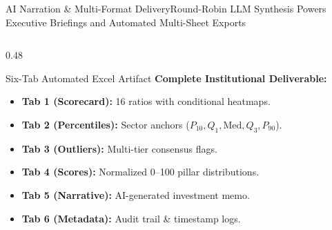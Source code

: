 \begin{frame}{AI Narration \& Multi-Format Delivery}{Round-Robin LLM Synthesis Powers Executive Briefings and Automated Multi-Sheet Exports}
\begin{columns}[T]
\begin{column}{0.48\textwidth}
            \begin{quantcard}[height=2.75cm]{Six-Tab Automated Excel Artifact}
                \fontsize{6.2pt}{7.7pt}\selectfont
                \textbf{\color{deepemerald}Complete Institutional Deliverable:}
                \begin{itemize}
                    \setlength{\itemsep}{1pt}
                    \item \textbf{Tab 1 (Scorecard):} 16 ratios with conditional heatmaps.
                    \item \textbf{Tab 2 (Percentiles):} Sector anchors ($P_{10}, Q_1, \text{Med}, Q_3, P_{90}$).
                    \item \textbf{Tab 3 (Outliers):} Multi-tier consensus flags.
                    \item \textbf{Tab 4 (Scores):} Normalized 0--100 pillar distributions.
                    \item \textbf{Tab 5 (Narrative):} AI-generated investment memo.
                    \item \textbf{Tab 6 (Metadata):} Audit trail \& timestamp logs.
                \end{itemize}
            \end{quantcard}
        \end{column}
    \end{columns}

    \vspace{0.1cm}
    \hfill {}
\end{frame}
